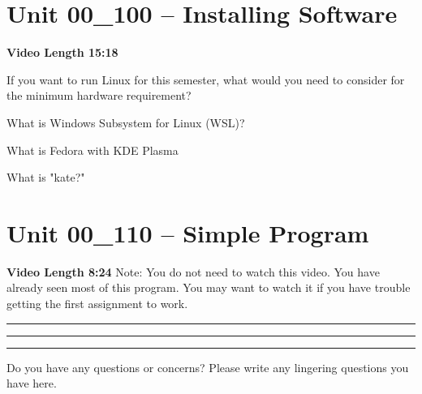 \documentclass[letterpaper,12pt]{exam}
\newcommand{\unit}{Unit 00}
\begin{document}
\begin{questions}
  \section*{\unit\_100 -- Installing Software}
  \par{\selectfont\textbf{Video Length 15:18}}
  \begin{samepage}
      \question If you want to run Linux for this semester, what would you need to consider for the minimum hardware requirement?

      \vspace{5mm}
  \end{samepage}
\begin{samepage}
    \question What is Windows Subsystem for Linux (WSL)?
    \vspace{5mm}
\end{samepage}
\par
 \begin{samepage}
     \question What is Fedora with KDE Plasma
     \vspace{5mm}
 \end{samepage}
 \par
  \begin{samepage}
      \question What is "kate?"
      \vspace{5mm}
  \end{samepage}
  \par
   \section*{\unit\_110 -- Simple Program}
   \par{\selectfont\textbf{Video Length 8:24}}
   Note:  You do not need to watch this video.  You have already seen most of this program.  You may want to watch it if you have trouble getting the first assignment to work.
   
   \rule{0.5\textwidth}{.4pt} %
  \rule{0.5\textwidth}{.4pt} %
 

\begin{center}
    \rule{0.5\textwidth}{.4pt}
\end{center}
Do you have any questions or concerns? Please write any lingering questions you have here.
  
\end{questions}
\end{document}
